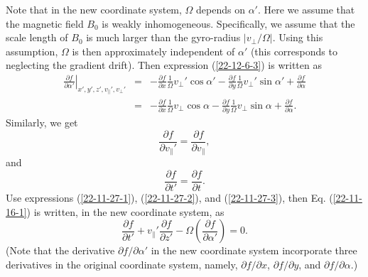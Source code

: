 \documentclass{article}
\begin{document}
Note that in the new coordinate system, $\Omega$ depends on $\alpha'$. Here we
assume that the magnetic field $B_0$ is weakly inhomogeneous. Specifically, we
assume that the scale length of $B_0$ is much larger than the gyro-radius $|
v_{\perp} / \Omega |$. Using this assumption, $\Omega$ is then approximately
independent of $\alpha'$ (this corresponds to neglecting the gradient drift).
Then expression (\ref{22-12-6-3}) is written as
\begin{eqnarray}
  \left. \frac{\partial f}{\partial \alpha'} \right|_{x', y', z',
  v_{\parallel}', v_{\perp}'} & = & - \frac{\partial f}{\partial x} 
  \frac{1}{\Omega} v_{\perp}' \cos \alpha' - \frac{\partial f}{\partial y} 
  \frac{1}{\Omega} v_{\perp}' \sin \alpha' + \frac{\partial f}{\partial
  \alpha} \nonumber\\
  & = & - \frac{\partial f}{\partial x}  \frac{1}{\Omega} v_{\perp} \cos
  \alpha - \frac{\partial f}{\partial y}  \frac{1}{\Omega} v_{\perp} \sin
  \alpha + \frac{\partial f}{\partial \alpha} .  \label{22-11-27-1}
\end{eqnarray}
Similarly, we get
\begin{equation}
  \label{22-11-27-2} \frac{\partial f}{\partial v_{\parallel}'} =
  \frac{\partial f}{\partial v_{\parallel}},
\end{equation}
and
\begin{equation}
  \label{22-11-27-3} \frac{\partial f}{\partial t'} = \frac{\partial
  f}{\partial t} .
\end{equation}
Use expressions (\ref{22-11-27-1}), (\ref{22-11-27-2}), and
(\ref{22-11-27-3}), then Eq. (\ref{22-11-16-1}) is written, in the new
coordinate system, as
\begin{equation}
  \label{22-11-16-3} \frac{\partial f}{\partial t'} + v_{\parallel}'
  \frac{\partial f}{\partial z'} - \Omega \left( \frac{\partial f}{\partial
  \alpha'} \right) = 0.
\end{equation}
(Note that the derivative $\partial f / \partial \alpha'$ in the new
coordinate system incorporate three derivatives in the original coordinate
system, namely, $\partial f / \partial x$, $\partial f / \partial y$, and
$\partial f / \partial \alpha$.)
\end{document}
